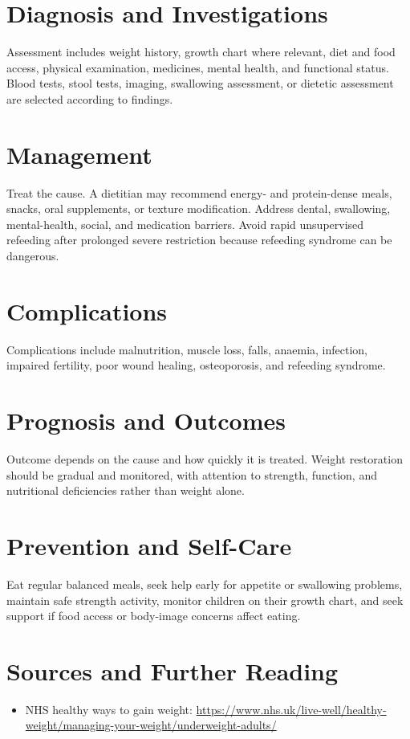 \section*{Diagnosis and Investigations}
Assessment includes weight history, growth chart where relevant, diet and food access, physical examination, medicines, mental health, and functional status. Blood tests, stool tests, imaging, swallowing assessment, or dietetic assessment are selected according to findings.
\section*{Management}
Treat the cause. A dietitian may recommend energy- and protein-dense meals, snacks, oral supplements, or texture modification. Address dental, swallowing, mental-health, social, and medication barriers. Avoid rapid unsupervised refeeding after prolonged severe restriction because refeeding syndrome can be dangerous.
\section*{Complications}
Complications include malnutrition, muscle loss, falls, anaemia, infection, impaired fertility, poor wound healing, osteoporosis, and refeeding syndrome.
\section*{Prognosis and Outcomes}
Outcome depends on the cause and how quickly it is treated. Weight restoration should be gradual and monitored, with attention to strength, function, and nutritional deficiencies rather than weight alone.
\section*{Prevention and Self-Care}
Eat regular balanced meals, seek help early for appetite or swallowing problems, maintain safe strength activity, monitor children on their growth chart, and seek support if food access or body-image concerns affect eating.
\section*{Sources and Further Reading}
\begin{itemize}
    \item NHS healthy ways to gain weight: \url{https://www.nhs.uk/live-well/healthy-weight/managing-your-weight/underweight-adults/}
\end{itemize}
